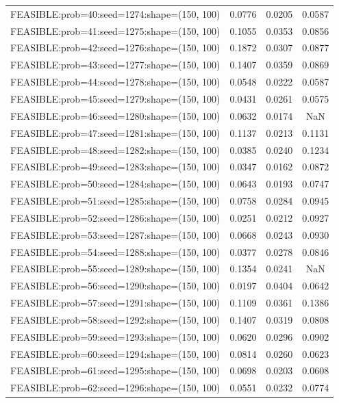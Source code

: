 \begin{longtable}{lccc}
FEASIBLE:prob=40:seed=1274:shape=(150, 100)  & 0.0776 & 0.0205 & 0.0587 \\
FEASIBLE:prob=41:seed=1275:shape=(150, 100)  & 0.1055 & 0.0353 & 0.0856 \\
FEASIBLE:prob=42:seed=1276:shape=(150, 100)  & 0.1872 & 0.0307 & 0.0877 \\
FEASIBLE:prob=43:seed=1277:shape=(150, 100)  & 0.1407 & 0.0359 & 0.0869 \\
FEASIBLE:prob=44:seed=1278:shape=(150, 100)  & 0.0548 & 0.0222 & 0.0587 \\
FEASIBLE:prob=45:seed=1279:shape=(150, 100)  & 0.0431 & 0.0261 & 0.0575 \\
FEASIBLE:prob=46:seed=1280:shape=(150, 100)  & 0.0632 & 0.0174 &    NaN \\
FEASIBLE:prob=47:seed=1281:shape=(150, 100)  & 0.1137 & 0.0213 & 0.1131 \\
FEASIBLE:prob=48:seed=1282:shape=(150, 100)  & 0.0385 & 0.0240 & 0.1234 \\
FEASIBLE:prob=49:seed=1283:shape=(150, 100)  & 0.0347 & 0.0162 & 0.0872 \\
FEASIBLE:prob=50:seed=1284:shape=(150, 100)  & 0.0643 & 0.0193 & 0.0747 \\
FEASIBLE:prob=51:seed=1285:shape=(150, 100)  & 0.0758 & 0.0284 & 0.0945 \\
FEASIBLE:prob=52:seed=1286:shape=(150, 100)  & 0.0251 & 0.0212 & 0.0927 \\
FEASIBLE:prob=53:seed=1287:shape=(150, 100)  & 0.0668 & 0.0243 & 0.0930 \\
FEASIBLE:prob=54:seed=1288:shape=(150, 100)  & 0.0377 & 0.0278 & 0.0846 \\
FEASIBLE:prob=55:seed=1289:shape=(150, 100)  & 0.1354 & 0.0241 &    NaN \\
FEASIBLE:prob=56:seed=1290:shape=(150, 100)  & 0.0197 & 0.0404 & 0.0642 \\
FEASIBLE:prob=57:seed=1291:shape=(150, 100)  & 0.1109 & 0.0361 & 0.1386 \\
FEASIBLE:prob=58:seed=1292:shape=(150, 100)  & 0.1407 & 0.0319 & 0.0808 \\
FEASIBLE:prob=59:seed=1293:shape=(150, 100)  & 0.0620 & 0.0296 & 0.0902 \\
FEASIBLE:prob=60:seed=1294:shape=(150, 100)  & 0.0814 & 0.0260 & 0.0623 \\
FEASIBLE:prob=61:seed=1295:shape=(150, 100)  & 0.0698 & 0.0203 & 0.0608 \\
FEASIBLE:prob=62:seed=1296:shape=(150, 100)  & 0.0551 & 0.0232 & 0.0774 \\

\end{longtable}
